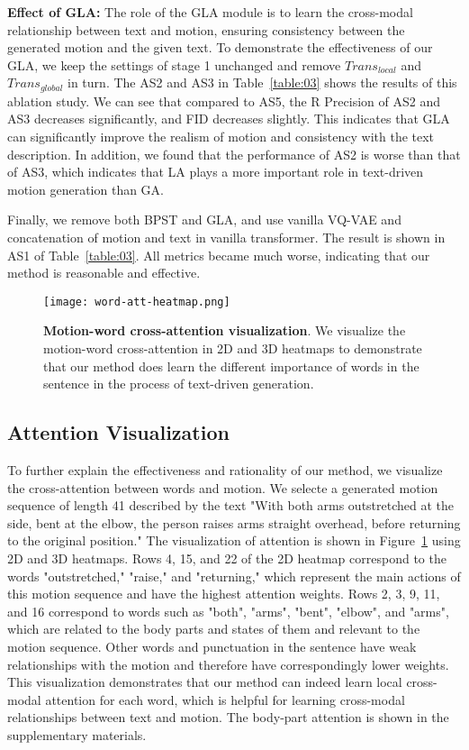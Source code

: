 \documentclass[10pt,twocolumn,letterpaper]{article}
\begin{document}
\textbf{Effect of GLA:}
The role of the GLA module is to learn the cross-modal relationship between text and motion, ensuring consistency between the generated motion and the given text. To demonstrate the effectiveness of our GLA, we keep the settings of stage 1 unchanged and remove ${Trans_{local}}$ and ${Trans_{global}}$ in turn. The AS2 and AS3 in Table~\ref{table:03} shows the results of this ablation study. We can see that compared to AS5, the R Precision of AS2 and AS3 decreases significantly, and FID decreases slightly. This indicates that GLA can significantly improve the realism of motion and consistency with the text description. In addition, we found that the performance of AS2 is worse than that of AS3, which indicates that LA plays a more important role in text-driven motion generation than GA.

Finally, we remove both BPST and GLA, and use vanilla VQ-VAE and concatenation of motion and text in vanilla transformer. The result is shown in AS1 of Table~\ref{table:03}. All metrics became much worse, indicating that our method is reasonable and effective.


\begin{figure}[t]
    \centering
    \texttt{[image: word-att-heatmap.png]}
    \caption{\textbf{Motion-word cross-attention visualization}. We visualize the motion-word cross-attention in 2D and 3D heatmaps to demonstrate that our method does learn the different importance of words in the sentence in the process of text-driven generation.}
    \label{img:07}
\end{figure}

\subsection{Attention Visualization}\label{ssec:att}

To further explain the effectiveness and rationality of our method, we visualize the cross-attention between words and motion. We selecte a generated motion sequence of length 41 described by the text "With both arms outstretched at the side, bent at the elbow, the person raises arms straight overhead, before returning to the original position." The visualization of attention is shown in Figure~\ref{img:07} using 2D and 3D heatmaps. Rows 4, 15, and 22 of the 2D heatmap correspond to the words "outstretched," "raise," and "returning," which represent the main actions of this motion sequence and have the highest attention weights. Rows 2, 3, 9, 11, and 16 correspond to words such as "both", "arms", "bent", "elbow", and "arms", which are related to the body parts and states of them and relevant to the motion sequence. Other words and punctuation in the sentence have weak relationships with the motion and therefore have correspondingly lower weights. This visualization demonstrates that our method can indeed learn local cross-modal attention for each word, which is helpful for learning cross-modal relationships between text and motion. The body-part attention is shown in the supplementary materials.
\end{document}
